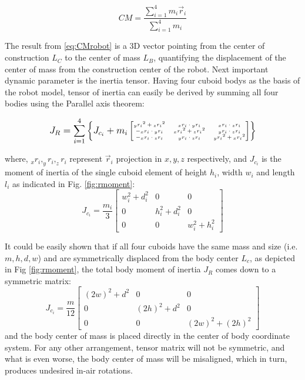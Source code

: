 \begin{equation}\label{eq:CMrobot}
CM=\frac{\sum_{i=1}^{4}m_i\vec{r}_i}{\sum_{i=1}^{4}m_i}
\end{equation}

The result from \eqref{eq:CMrobot} is a 3D vector pointing from the center of construction $L_C$ to the center of mass $L_B$, quantifying the displacement of the center of mass from the construction center of the robot. Next important dynamic parameter is the inertia tensor. Having four cuboid bodys as the basis of the robot model, tensor of inertia can easily be derived by summing all four bodies using the Parallel axis theorem:

\begin{equation}
\tiny
J_R=\sum_{i=1}^{4}\left \{J_{c_i}+m_i\begin{bmatrix}
{_yr_i}^2+{_zr_i}^2 & {_xr_i}\cdot {_yr_i} & {_xr_i}\cdot {_zr_i} \\ 
-{_xr_i}\cdot {_yr_i} & {_xr_i}^2+{_zr_i}^2 & {_yr_i}\cdot {_zr_i}\\ 
-{_xr_i}\cdot {_zr_i} & {_yr_i}\cdot {_zr_i} & {_yr_i}^2+{_xr_i}^2
\end{bmatrix} \right \}
\normalsize
\end{equation}

where, $_xr_i, _yr_i, _zr_i$ represent $\vec{r}_i$ projection in $x,y,z$ respectively, and $J_{c_i}$ is the moment of inertia of the single cuboid element of height $h_i$, width $w_i$ and length $l_i$ as indicated in Fig. \ref{fig:rmoment}:
\begin{equation}
J_{c_i}=\frac{m_i}{3}\begin{bmatrix}
w_i^2+d_i^2 &0&0 \\ 
0 &h_i^2+d_i^2&0\\ 
0 &0& w_i^2+h_i^2
\end{bmatrix}
\end{equation} 

It could be easily shown that if all four cuboids have the same mass and size (i.e. $m,h,d,w$) and are symmetrically displaced from the body center $L_c$, as depicted in Fig \ref{fig:rmoment}, the total body moment of inertia $J_R$ comes down to a symmetric matrix: 
\begin{equation}
J_{c_i}=\frac{m}{12}\begin{bmatrix}
(2w)^2+d^2 &0&0 \\ 
0 &(2h)^2+d^2&0\\ 
0 &0& (2w)^2+(2h)^2
\end{bmatrix}
\end{equation} 
and the body center of mass is placed directly in the center of body coordinate system. For any other arrangement, tensor matrix will not be symmetric, and what is even worse, the body center of mass will be misaligned, which in turn, produces undesired in-air rotations.

